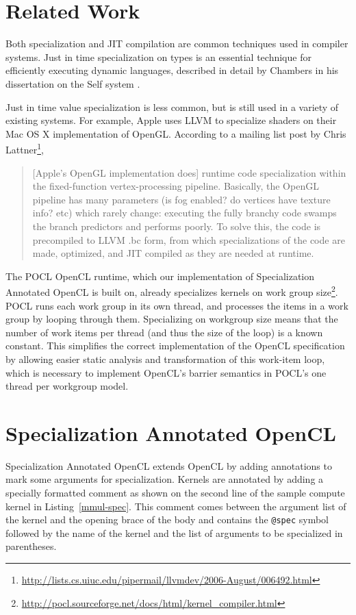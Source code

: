 \documentclass{acm_proc_article-sp}
\begin{document}
\section{Related Work}

Both specialization and JIT compilation are common techniques used in compiler
systems. Just in time specialization on types is an essential technique for
efficiently executing dynamic languages, described in detail by Chambers in his
dissertation on the Self system \cite{Chambers:1992:Self}.

Just in time value specialization is less common, but is still used in a
variety of existing systems. For example, Apple uses LLVM to specialize shaders
on their Mac OS X implementation of OpenGL. According to a mailing list post by
Chris
Lattner\footnote{\url{http://lists.cs.uiuc.edu/pipermail/llvmdev/2006-August/006492.html}},

\begin{quote}
[Apple's OpenGL implementation does] runtime code specialization within the
fixed-function vertex-processing pipeline. Basically, the OpenGL pipeline has
many parameters (is fog enabled?  do vertices have texture info? etc) which
rarely change: executing the fully branchy code swamps the branch predictors
and performs poorly. To solve this, the code is precompiled to LLVM .bc form,
from which specializations of the code are made, optimized, and JIT compiled as
they are needed at runtime.
\end{quote}

The POCL OpenCL runtime, which our implementation of Specialization Annotated
OpenCL is built on, already specializes kernels on work group
size\footnote{\url{http://pocl.sourceforge.net/docs/html/kernel\_compiler.html}}.
POCL runs each work group in its own thread, and processes the items in a work
group by looping through them. Specializing on workgroup size means that the
number of work items per thread (and thus the size of the loop) is a known
constant. This simplifies the correct implementation of the OpenCL
specification by allowing easier static analysis and transformation of this
work-item loop, which is necessary to implement OpenCL's barrier semantics in
POCL's one thread per workgroup model.

\section{Specialization Annotated OpenCL}

Specialization Annotated OpenCL extends OpenCL by adding annotations to mark
some arguments for specialization. Kernels are annotated by adding a specially
formatted comment as shown on the second line of the sample compute kernel in
Listing~\ref{mmul-spec}. This comment comes between the argument list of the
kernel and the opening brace of the body and contains the {\tt @spec} symbol
followed by the name of the kernel and the list of arguments to be specialized
in parentheses.
\end{document}
